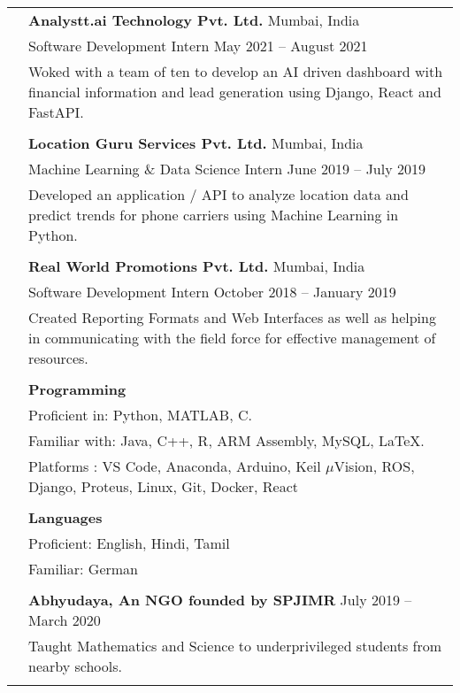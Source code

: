 \documentclass[letterpaper, 10pt]{article}
\begin{document}
\begin{longtable}{p{1.3in}p{4.8in}}

{\color{OliveGreen}{Industry experience}}
& {\textbf{Analystt.ai Technology Pvt. Ltd.}} \hfill Mumbai, India\\
& Software Development Intern \hfill May 2021 – August 2021 \\
& Woked with a team of ten to develop an AI driven dashboard with financial information and lead generation using Django, React and FastAPI.\\
& \\

& {\textbf{Location Guru Services Pvt. Ltd.}} \hfill Mumbai, India\\
& Machine Learning \& Data Science Intern \hfill June 2019 – July 2019 \\
& Developed an application / API to analyze location data and predict trends for phone carriers using Machine Learning in Python. \\
& \\
 
& {\textbf{Real World Promotions Pvt. Ltd.}} \hfill Mumbai, India\\
& Software Development Intern \hfill October 2018 – January 2019 \\
& Created Reporting Formats and Web Interfaces as well as helping in communicating with the field force for effective management of  resources.\\
& \\


{\color{OliveGreen}{Skills}} 
& \textbf{Programming}\\
& Proficient in: Python, MATLAB, C. \\
& Familiar with: Java, C++, R, ARM Assembly, MySQL, \LaTeX. \\
& Platforms : VS Code, Anaconda, Arduino, Keil $\mu$Vision, ROS, Django, Proteus, Linux, Git, Docker, React \\
& \\

& \textbf{Languages} \\
& Proficient: English, Hindi, Tamil\\
& Familiar: German \\
& \\


\color{OliveGreen}{Service and outreach}
& \textbf{Abhyudaya, An NGO founded by SPJIMR} \hfill July 2019 – March 2020 \\
& Taught Mathematics and Science to underprivileged students from nearby schools. \\
& \\


\end{longtable}
\end{document}

